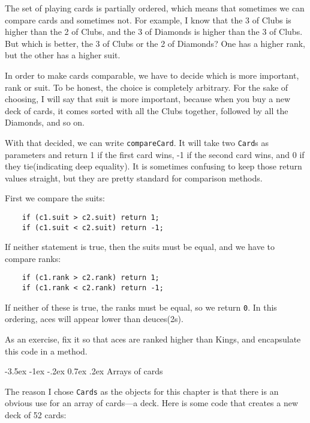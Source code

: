 \documentclass{book}
\makeatletter
\renewcommand{\section}{\@startsection 
    {section} {1} {0mm}%
    {-3.5ex \@plus -1ex \@minus -.2ex}%
    {0.7ex \@plus.2ex}%
    {\normalfont\Large\bfseries}}
\makeatother
\begin{document}
The set of playing cards is partially ordered, which means that
sometimes we can compare cards and sometimes not.  For example, I know
that the 3 of Clubs is higher than the 2 of Clubs, and the 3 of
Diamonds is higher than the 3 of Clubs.  But which is better, the 3 of
Clubs or the 2 of Diamonds?  One has a higher rank, but the other has
a higher suit.


In order to make cards comparable, we have to decide which is more
important, rank or suit.  To be honest, the choice is completely
arbitrary.  For the sake of choosing, I will say that suit is more
important, because when you buy a new deck of cards, it comes sorted
with all the Clubs together, followed by all the Diamonds, and so on.

With that decided, we can write {\tt compareCard}.  It
will take two {\tt Card}s as parameters and return 1 if
the first card wins, -1 if the second card wins, and 0 if
they tie(indicating deep equality).  It is sometimes confusing
to keep those return values straight, but they are pretty
standard for comparison methods.

First we compare the suits:

\begin{verbatim}
    if (c1.suit > c2.suit) return 1;
    if (c1.suit < c2.suit) return -1;
\end{verbatim}
%
If neither statement is true, then the suits must be equal,
and we have to compare ranks:

\begin{verbatim}
    if (c1.rank > c2.rank) return 1;
    if (c1.rank < c2.rank) return -1;
\end{verbatim}
%
If neither of these is true, the ranks must be equal,
so we return {\tt 0}.  In this ordering, aces will appear
lower than deuces(2s).

As an exercise, fix it so that aces are ranked higher than Kings, and
encapsulate this code in a method.


\section{Arrays of cards}
\label{cardarray}

The reason I chose {\tt Cards} as the objects for this chapter is that
there is an obvious use for an array of cards---a deck.  Here is some
code that creates a new deck of 52 cards:
\end{document}
